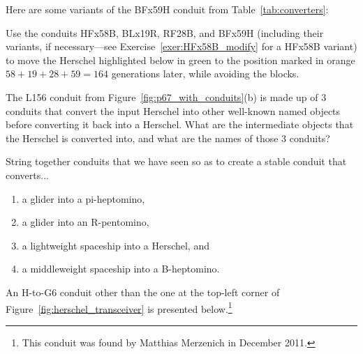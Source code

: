 \begin{multicols}{2}
	
	\begin{problemstar}\label{exer:herschel_variants}
		Here are some variants of the BFx59H conduit from Table~\ref{tab:converters}:
		\begin{center}
		\end{center}
		Use the conduits HFx58B, BLx19R, RF28B, and BFx59H (including their variants, if necessary---see Exercise~\ref{exer:HFx58B_modify} for a HFx58B variant) to move the Herschel highlighted below in green to the position marked in orange $58+19+28+59=164$ generations later, while avoiding the blocks.	
		\begin{center}
		\end{center}
	\end{problemstar}
	
	
	\mfilbreak
	
	
	\begin{problemstar}\label{exer:l156_break_apart}
		The L156 conduit from Figure~\ref{fig:p67_with_conduits}(b) is made up of $3$ conduits that convert the input Herschel into other well-known named objects before converting it back into a Herschel. What are the intermediate objects that the Herschel is converted into, and what are the names of those $3$ conduits?
	\end{problemstar}
	
	
	\mfilbreak
	
	
	\begin{problem}\label{exer:composite_converters}
		String together conduits that we have seen so as to create a stable conduit that converts...\smallskip
		
		\begin{enumerate}[label=\bf\color{ocre}(\alph*)]
			\item a glider into a pi-heptomino,
			
			\item a glider into an R-pentomino,
			
			\item a lightweight spaceship into a Herschel, and
			
			\item a middleweight spaceship into a B-heptomino.
		\end{enumerate}
	\end{problem}
	
	
	\mfilbreak
	
	
	\begin{problem}\label{exer:h_to_g6}
		An H-to-G6 conduit other than the one at the top-left corner of Figure~\ref{fig:herschel_transceiver} is presented below.\footnote{This conduit was found by Matthias Merzenich in December 2011.}
		

\end{problem}
\end{multicols}
